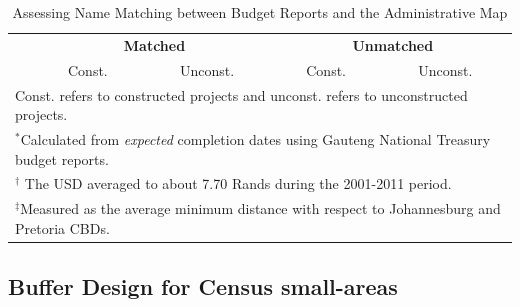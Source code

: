 \documentclass[12pt]{article}
\begin{document}
\vspace{0mm}
\begin{table}
\centering
\caption{Assessing Name Matching between Budget Reports and the Administrative Map}\label{table:stringmatch}
\vspace{0mm}
\begin{tabular}{l*{1}{cccc}}
\toprule
  & \multicolumn{2}{c}{\textbf{Matched}}& \multicolumn{2}{c}{\textbf{Unmatched}}    \\
  &Const. & Unconst. &Const. & Unconst.  \\
\midrule

\bottomrule
\multicolumn{5}{l}{\scriptsize Const. refers to constructed projects and unconst. refers to unconstructed projects.}\\[-.5em]
\multicolumn{5}{l}{\scriptsize $^*$Calculated from {\it expected} completion dates using Gauteng National Treasury budget reports.}\\[-.5em]
\multicolumn{5}{l}{\scriptsize $^\dagger$ The USD averaged to about 7.70 Rands during the 2001-2011 period.}\\[-.5em]
\multicolumn{5}{l}{\scriptsize $^\ddagger$Measured as the average minimum distance with respect to Johannesburg and Pretoria CBDs. } \\[-.5em]
\end{tabular}
\end{table} 


\subsection{Buffer Design for Census small-areas}
\label{appendix:bufferdesign}

\vspace{-3mm}
\end{document}
